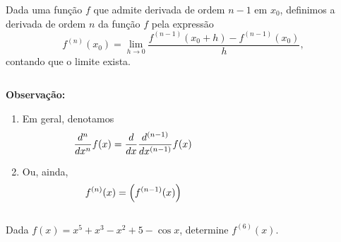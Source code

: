 \begin{frame}
  \begin{definition}
    Dada uma função $f$ que admite derivada de ordem $n-1$ em $x_{0}$, definimos a derivada de ordem $n$ da função $f$ pela expressão
    \begin{equation*}
      f^{(n)}(x_{0}) = \lim_{h\to 0}\frac{f^{(n-1)}(x_{0}+h)-f^{(n-1)}(x_{0})}{h},
    \end{equation*}
    contando que o limite exista.
  \end{definition}
  \begin{columns}[onlytextwidth]
    \begin{column}{0.5\textwidth}
      \begin{highlight}
        \textbf{Observação:}
        \begin{enumerate}
          \item Em geral, denotamos\vspace*{-0.2cm}
          \begin{equation*}
            \frac{d^{n}}{dx^{n}}f(x) = \frac{d}{dx}\frac{d^{(n-1)}}{dx^{(n-1)}}f(x)\vspace*{-0.2cm}
          \end{equation*}
          \item Ou, ainda,\vspace*{-0.2cm}
          \begin{equation*}
            f^{(n)}(x) = \left(f^{(n-1)}(x)\right)\vspace*{-0.2cm}
          \end{equation*}
        \end{enumerate}
      \end{highlight}
    \end{column}
    \begin{column}{0.5\textwidth}
      
    \end{column}
  \end{columns}
\end{frame}

\begin{frame}
  \begin{columns}[onlytextwidth]
    \begin{column}{0.65\textwidth}\vspace{-0.5cm}
      \begin{example}
        Dada $f(x) = x^{5} + x^{3} - x^2 + 5 - \cos{x}$, determine $f^{(6)}(x)$.
      \end{example}
    \end{column}
    \begin{column}{0.35\textwidth}\vspace{-0.75cm}
    \end{column}
  \end{columns}
\end{frame}

